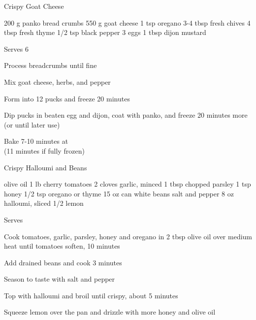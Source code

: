 \begin{recipe}{Crispy Goat Cheese}{\vegetarian{}}
\begin{ingredients}
200 g panko bread crumbs
550 g goat cheese
1 tsp oregano
3-4 tbsp fresh chives
4 tbsp fresh thyme
1/2 tsp black pepper
3 eggs
1 tbsp dijon mustard
\end{ingredients}
\nextcolumn
Serves 6
\begin{steps}
\item Process breadcrumbs until fine
\item Mix goat cheese, herbs, and pepper
\item Form into 12 pucks and freeze 20 minutes
\item Dip pucks in beaten egg and dijon, coat with panko, and freeze 20 minutes more \\(or until later use)
\item Bake 7-10 minutes at  \\(11 minutes if fully frozen)
\end{steps}
\end{recipe}

\begin{recipe}{Crispy Halloumi and Beans}{\vegetarian{}}
\begin{ingredients}
olive oil
1 lb cherry tomatoes
2 cloves garlic, minced
1 tbsp chopped parsley
1 tsp honey
1/2 tsp oregano or thyme
15 oz can white beans
salt and pepper
8 oz halloumi, sliced
1/2 lemon
\end{ingredients}
\nextcolumn
Serves
\begin{steps}
    \item Cook tomatoes, garlic, parsley, honey and oregano in 2 tbsp olive oil over medium heat until tomatoes soften, 10 minutes
    \item Add drained beans and cook 3 minutes
    \item Season to taste with salt and pepper
    \item Top with halloumi and broil until crispy, about 5 minutes
    \item Squeeze lemon over the pan and drizzle with more honey and olive oil
\end{steps}
\end{recipe}
